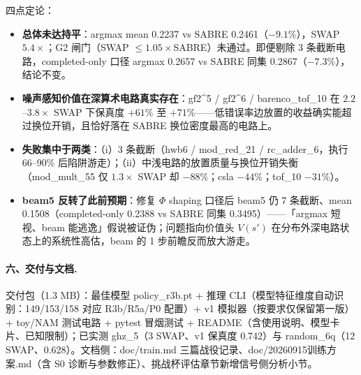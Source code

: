 四点定论：
\begin{itemize}
    \item \textbf{总体未达持平}：argmax mean 0.2237 vs SABRE 0.2461（$-9.1\%$），SWAP $5.4\times$；G2 闸门（SWAP $\le1.05\times$SABRE）未通过。即便剔除 3 条截断电路，completed-only 口径 argmax 0.2657 vs SABRE 同集 0.2867（$-7.3\%$），结论不变。
    \item \textbf{噪声感知价值在深算术电路真实存在}：gf2\^{}5 / gf2\^{}6 / barenco\_tof\_10 在 $2.2$--$3.8\times$ SWAP 下保真度 $+61\%$ 至 $+71\%$——低错误率边放置的收益确实能超过换位开销，且恰好落在 SABRE 换位密度最高的电路上。
    \item \textbf{失败集中于两类}：（i）3 条截断（hwb6 / mod\_red\_21 / rc\_adder\_6，执行 66--90\% 后陷阱游走）；（ii）中浅电路的放置质量与换位开销失衡（mod\_mult\_55 仅 $1.3\times$ SWAP 却 $-88\%$；csla $-44\%$；tof\_10 $-31\%$）。
    \item \textbf{beam5 反转了此前预期}：修复 $\Phi$ shaping 口径后 beam5 仍 7 条截断、mean 0.1508（completed-only 0.2388 vs SABRE 同集 0.3495）——「argmax 短视、beam 能逃逸」假说被证伪；问题指向价值头 $V(s')$ 在分布外深电路状态上的系统性高估，beam 的 1 步前瞻反而放大游走。
\end{itemize}

\paragraph{六、交付与文档.}
交付包（1.3 MB）：最佳模型 policy\_r3b.pt + 推理 CLI（模型特征维度自动识别：149/153/158 对应 R3b/R5a/P0 配置）+ v1 模拟器（按要求仅保留第一版）+ toy/NAM 测试电路 + pytest 冒烟测试 + README（含使用说明、模型卡片、已知限制）；已实测 ghz\_5（3 SWAP、v1 保真度 0.742）与 random\_6q（12 SWAP、0.628）。文档侧：doc/train.md 三篇战役记录、doc/20260915训练方案.md（含 S0 诊断与参数修正）、挑战杯评估章节新增信号侧分析小节。

